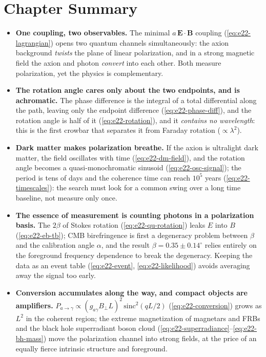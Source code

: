\section{Chapter Summary}
\label{sec:e22-summary}

\begin{itemize}
\item \textbf{One coupling, two observables.} The minimal \(a\,\bm E\cdot\bm B\) coupling (\eqref{eq:e22-lagrangian}) opens two quantum channels simultaneously: the axion background \emph{twists} the plane of linear polarization, and in a strong magnetic field the axion and photon \emph{convert} into each other. Both measure polarization, yet the physics is complementary.
\item \textbf{The rotation angle cares only about the two endpoints, and is achromatic.} The phase difference is the integral of a total differential along the path, leaving only the endpoint difference (\eqref{eq:e22-phase-diff}), and the rotation angle is half of it (\eqref{eq:e22-rotation}), and it \emph{contains no wavelength}: this is the first crowbar that separates it from Faraday rotation (\(\propto\lambda^2\)).
\item \textbf{Dark matter makes polarization breathe.} If the axion is ultralight dark matter, the field oscillates with time (\eqref{eq:e22-dm-field}), and the rotation angle becomes a quasi-monochromatic sinusoid (\eqref{eq:e22-osc-signal}); the period is tens of days and the coherence time can reach \(10^5\) years (\eqref{eq:e22-timescales}): the search must look for a common swing over a long time baseline, not measure only once.
\item \textbf{The essence of measurement is counting photons in a polarization basis.} The \(2\beta\) of Stokes rotation (\eqref{eq:e22-qu-rotation}) leaks \(E\) into \(B\) (\eqref{eq:e22-eb-tb}); CMB birefringence is first a degeneracy problem between \(\beta\) and the calibration angle \(\alpha\), and the result \(\beta=0.35\pm0.14^\circ\) relies entirely on the foreground frequency dependence to break the degeneracy. Keeping the data as an event table (\eqref{eq:e22-event}, \eqref{eq:e22-likelihood}) avoids averaging away the signal too early.
\item \textbf{Conversion accumulates along the way, and compact objects are amplifiers.} \(P_{a\to\gamma}\propto(g_{a\gamma}B_\perp L)^2\,\mathrm{sinc}^2(qL/2)\) (\eqref{eq:e22-conversion}) grows as \(L^2\) in the coherent region; the extreme magnetization of magnetars and FRBs and the black hole superradiant boson cloud (\eqref{eq:e22-superradiance}--\eqref{eq:e22-bh-mass}) move the polarization channel into strong fields, at the price of an equally fierce intrinsic structure and foreground.

\end{itemize}
